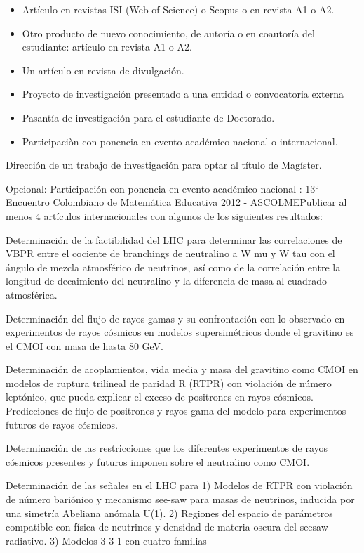 \begin{itemize}
\item Artículo en revistas ISI (Web of Science) o Scopus o en revista A1 o A2.
\item Otro producto de nuevo conocimiento, de autoría o en coautoría
  del estudiante: artículo en revista A1 o A2.
\item Un artículo en revista de divulgación.
\item Proyecto de investigación presentado a una entidad o convocatoria externa
\item Pasantía de investigación para el estudiante de Doctorado.
\item Participaciòn con ponencia en evento académico nacional o
  internacional.
\end{itemize}



Dirección de un trabajo de investigación para optar al título de Magíster.

Opcional: Participación con ponencia en evento académico nacional :
    13° Encuentro Colombiano de Matemática Educativa 2012 - ASCOLMEPublicar al menos 4 artículos internacionales con algunos de los siguientes resultados:

Determinación de la factibilidad del LHC para determinar las correlaciones de VBPR entre el cociente de branchings de neutralino a W mu y W tau con el ángulo de mezcla atmosférico de neutrinos, así como de la correlación entre la longitud de decaimiento del neutralino y la diferencia de masa al cuadrado atmosférica.

Determinación del flujo de rayos gamas y su confrontación con lo observado en experimentos de rayos cósmicos en modelos supersimétricos donde el gravitino es el CMOI con masa de hasta 80 GeV. 

Determinación de acoplamientos, vida media y masa del gravitino como CMOI en modelos de ruptura trilineal de paridad R (RTPR) con violación de número leptónico, que pueda explicar el exceso de positrones en rayos cósmicos. Predicciones de flujo de positrones y rayos gama del modelo para experimentos futuros de rayos cósmicos. 

Determinación de las restricciones que los diferentes experimentos de rayos cósmicos 
presentes y futuros imponen sobre el neutralino como CMOI. 

Determinación de las señales en el LHC para 1) Modelos de RTPR con violación de número bariónico y mecanismo see-saw para masas de neutrinos, inducida por una simetría Abeliana anómala U(1). 2) Regiones del espacio de parámetros compatible con física de neutrinos y densidad de materia oscura del seesaw radiativo. 3) Modelos 3-3-1 con cuatro familias

